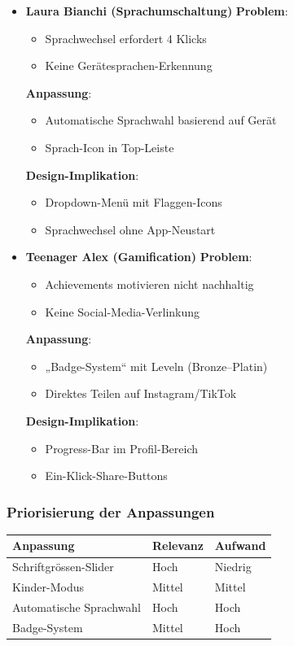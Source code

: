 \documentclass[10pt]{article}
\begin{document}
\begin{itemize}
	\item \textbf{Laura Bianchi (Sprachumschaltung)}
	\subitem \textbf{Problem}: 
	\begin{itemize}
		\item Sprachwechsel erfordert 4 Klicks
		\item Keine Gerätesprachen-Erkennung
	\end{itemize}
	\subitem \textbf{Anpassung}: 
	\begin{itemize}
		\item Automatische Sprachwahl basierend auf Gerät
		\item Sprach-Icon in Top-Leiste
	\end{itemize}
	\subitem \textbf{Design-Implikation}: 
	\begin{itemize}
		\item Dropdown-Menü mit Flaggen-Icons
		\item Sprachwechsel ohne App-Neustart
	\end{itemize}
	
	\item \textbf{Teenager Alex (Gamification)}
	\subitem \textbf{Problem}: 
	\begin{itemize}
		\item Achievements motivieren nicht nachhaltig
		\item Keine Social-Media-Verlinkung
	\end{itemize}
	\subitem \textbf{Anpassung}: 
	\begin{itemize}
		\item „Badge-System“ mit Leveln (Bronze–Platin)
		\item Direktes Teilen auf Instagram/TikTok
	\end{itemize}
	\subitem \textbf{Design-Implikation}: 
	\begin{itemize}
		\item Progress-Bar im Profil-Bereich
		\item Ein-Klick-Share-Buttons
	\end{itemize}
\end{itemize}

\subsubsection{Priorisierung der Anpassungen}
\begin{center}
	\begin{tabular}{|l|l|l|}
		\hline
		\textbf{Anpassung} & \textbf{Relevanz} & \textbf{Aufwand} \\ 
		\hline
		Schriftgrössen-Slider & Hoch & Niedrig \\
		Kinder-Modus & Mittel & Mittel \\
		Automatische Sprachwahl & Hoch & Hoch \\
		Badge-System & Mittel & Hoch \\
		\hline
	\end{tabular}
\end{center}
\end{document}
